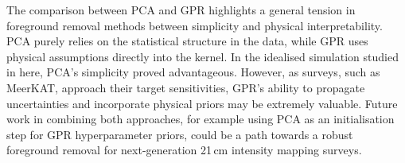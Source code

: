 The comparison between PCA and GPR highlights a general tension in foreground removal methods between simplicity and physical interpretability. PCA purely relies on the statistical structure in the data, while GPR uses physical assumptions directly into the kernel. In the idealised simulation studied in here, PCA's simplicity proved advantageous. However, as surveys, such as MeerKAT, approach their target sensitivities, GPR's ability to propagate uncertainties and incorporate physical priors may be extremely valuable. Future work in combining both approaches, for example using PCA as an initialisation step for GPR hyperparameter priors, could be a path towards a robust foreground removal for next-generation 21\,cm intensity mapping surveys.